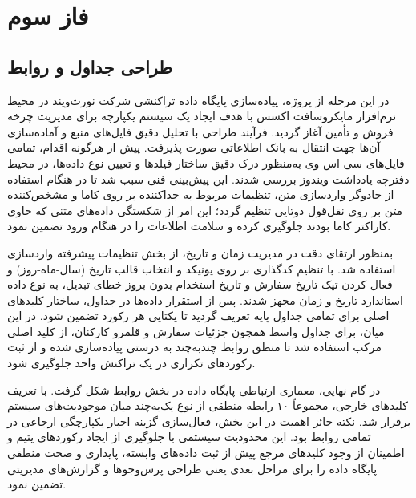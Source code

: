 \documentclass[14pt,a4paper]{extarticle}
\begin{document}
	\section{فاز سوم}
	
	\subsection{طراحی جداول و روابط}
	در این مرحله از پروژه، پیاده‌سازی پایگاه داده تراکنشی شرکت نورث‌ویند در محیط نرم‌افزار مایکروسافت اکسس با هدف ایجاد یک سیستم یکپارچه برای مدیریت چرخه فروش و تأمین آغاز گردید. فرآیند طراحی با تحلیل دقیق فایل‌های منبع و آماده‌سازی آن‌ها جهت انتقال به بانک اطلاعاتی صورت پذیرفت. پیش از هرگونه اقدام، تمامی فایل‌های سی اس وی به‌منظور درک دقیق ساختار فیلدها و تعیین نوع داده‌ها، در محیط دفترچه یادداشت ویندوز  بررسی شدند. این پیش‌بینی فنی سبب شد تا در هنگام استفاده از جادوگر واردسازی متن، تنظیمات مربوط به جداکننده بر روی کاما و مشخص‌کننده متن بر روی نقل‌قول دوتایی تنظیم گردد؛ این امر از شکستگی داده‌های متنی که حاوی کاراکتر کاما بودند جلوگیری کرده و سلامت اطلاعات را در هنگام ورود تضمین نمود.
	
	بمنظور ارتقای دقت در مدیریت زمان و تاریخ، از بخش تنظیمات پیشرفته واردسازی استفاده شد. با تنظیم کدگذاری بر روی یونیکد و انتخاب قالب تاریخ (سال-ماه-روز) و فعال کردن تیک  تاریخ سفارش و تاریخ استخدام بدون بروز خطای تبدیل، به نوع داده استاندارد تاریخ و زمان مجهز شدند. پس از استقرار داده‌ها در جداول، ساختار کلیدهای اصلی برای تمامی جداول پایه تعریف گردید تا یکتایی هر رکورد تضمین شود. در این میان، برای جداول واسط همچون جزئیات سفارش و قلمرو کارکنان، از کلید اصلی مرکب استفاده شد تا منطق روابط چند‌به‌چند به درستی پیاده‌سازی شده و از ثبت رکوردهای تکراری در یک تراکنش واحد جلوگیری شود.
	
	در گام نهایی، معماری ارتباطی پایگاه داده در بخش روابط شکل گرفت. با تعریف کلیدهای خارجی، مجموعاً ۱۰ رابطه منطقی از نوع یک‌به‌چند میان موجودیت‌های سیستم برقرار شد. نکته حائز اهمیت در این بخش، فعال‌سازی گزینه اجبار یکپارچگی ارجاعی در تمامی روابط بود. این محدودیت سیستمی با جلوگیری از ایجاد رکوردهای یتیم و اطمینان از وجود کلیدهای مرجع پیش از ثبت داده‌های وابسته، پایداری و صحت منطقی پایگاه داده را برای مراحل بعدی یعنی طراحی پرس‌وجوها و گزارش‌های مدیریتی تضمین نمود.
	
\end{document}
